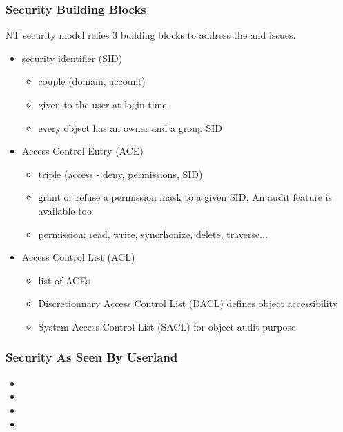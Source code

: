 
\begin{frame}
  \frametitle{Security Building Blocks}

  NT security model relies 3 building blocks to address the
   and  issues.

  \begin{itemize}

    \item
      security identifier (SID)
      \begin{itemize}
      \item
        couple (domain, account)
      \item
        given to the user at login time
      \item
        every object has an owner and a group SID
      \end{itemize}

    \item
      Access Control Entry (ACE)
      \begin{itemize}
        \item
          triple (access - deny, permissions, SID)
        \item
          grant or refuse a permission mask to a given SID. An audit feature is available too
        \item
          permission: read, write, syncrhonize, delete, traverse...
      \end{itemize}

    \item
      Access Control List (ACL)
      \begin{itemize}
        \item
          list of ACEs
        \item
          Discretionnary Access Control List (DACL) defines object accessibility
        \item
          System Access Control List (SACL) for object audit purpose
      \end{itemize}

  \end{itemize}

\end{frame}


\begin{frame}[containsverbatim]
  \frametitle{Security As Seen By Userland}

  \begin{itemize}
    \item
    \item
    \item
    \item
  \end{itemize}

\end{frame}


